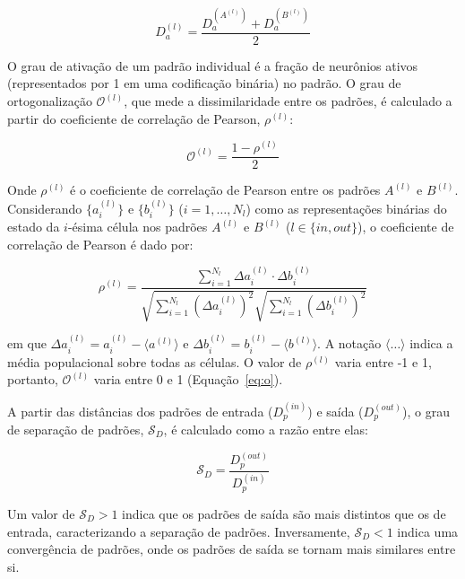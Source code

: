 \begin{equation}
    \label{eq:da}
    D_a^{(l)} = \frac{D_a^{(A^{(l)})} + D_a^{(B^{(l)})}}{2}
\end{equation}

O grau de ativação de um padrão individual é a fração de neurônios ativos (representados por 1 em uma codificação binária) no padrão.
O grau de ortogonalização $\mathcal{O}^{(l)}$, que mede a dissimilaridade entre os padrões, é calculado a partir do coeficiente de correlação de Pearson, $\rho^{(l)}$:

\begin{equation}
    \label{eq:o}
    \mathcal{O}^{(l)} = \frac{1 - \rho^{(l)}}{2}
\end{equation}

Onde $\rho^{(l)}$ é o coeficiente de correlação de Pearson entre os padrões $A^{(l)}$ e $B^{(l)}$.
Considerando $\{a_i^{(l)}\}$ e $\{b_i^{(l)}\}$ ($i=1, \dots, N_l$) como as representações binárias do estado da $i$-ésima célula nos padrões $A^{(l)}$ e $B^{(l)}$ ($l \in \{in, out\}$), o coeficiente de correlação de Pearson é dado por:

\begin{equation}
    \label{eq:pearson}
    \rho^{(l)} = \frac{\sum_{i=1}^{N_l} \Delta a_i^{(l)} \cdot \Delta b_i^{(l)}}{\sqrt{\sum_{i=1}^{N_l} (\Delta a_i^{(l)})^2} \sqrt{\sum_{i=1}^{N_l} (\Delta b_i^{(l)})^2}}
\end{equation}

em que $\Delta a_i^{(l)} = a_i^{(l)} - \langle a^{(l)} \rangle$ e $\Delta b_i^{(l)} = b_i^{(l)} - \langle b^{(l)} \rangle$. A
notação $\langle \dots \rangle$ indica a média populacional sobre todas as células. O valor de $\rho^{(l)}$ varia entre -1 e 1,
portanto, $\mathcal{O}^{(l)}$ varia entre 0 e 1 (Equação~\ref{eq:o}).

A partir das distâncias dos padrões de entrada ($D_p^{(in)}$) e saída ($D_p^{(out)}$), o grau de separação de padrões, $\mathcal{S}_D$, é calculado como a razão entre elas:

\begin{equation}
    \label{eq:sd}
    \mathcal{S}_D = \frac{D_p^{(out)}}{D_p^{(in)}}
\end{equation}

Um valor de $\mathcal{S}_D > 1$ indica que os padrões de saída são mais distintos que os de entrada, caracterizando a separação de padrões. Inversamente, $\mathcal{S}_D < 1$ indica uma convergência de padrões, onde os padrões de saída se tornam mais similares entre si.

